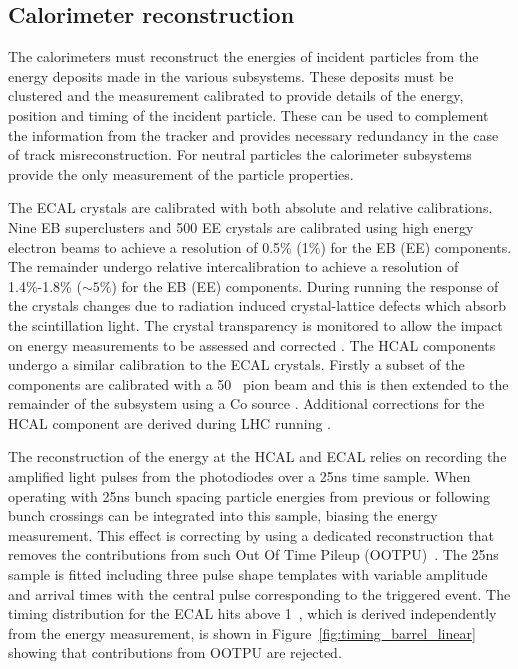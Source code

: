 \subsection{Calorimeter reconstruction}

The calorimeters must reconstruct the energies of incident particles from the energy deposits made in the 
various subsystems. These deposits must be clustered and the measurement calibrated to provide 
details of the energy, position and timing of the incident particle. These can be used to complement 
the information from the tracker and provides necessary redundancy in the case of track
misreconstruction. For neutral particles the calorimeter subsystems provide the only measurement of
the particle properties.

The ECAL crystals are calibrated with both absolute and relative calibrations. Nine EB superclusters
and 500 EE crystals are calibrated using high energy electron beams to achieve a resolution of 0.5\% (1\%) for the EB (EE) components. 
The remainder undergo relative intercalibration to achieve a resolution of 1.4\%-1.8\% ($\sim5\%$) for the EB (EE) components. 
During running the response of the crystals changes due to radiation induced crystal-lattice defects which absorb the scintillation light. 
The crystal transparency is monitored to allow the impact on energy measurements to be assessed and corrected \cite{ecal_calib}. 
The HCAL components undergo a similar calibration to the ECAL crystals. Firstly a subset of the components are calibrated with
a 50 \GeV~pion beam and this is then extended to the remainder of the subsystem using a Co source \cite{hcal_beam}. Additional corrections
for the HCAL component are derived during LHC running \cite{hcal_calib}.

The reconstruction of the energy at the HCAL and ECAL relies on recording the amplified light pulses from the photodiodes over a 25ns time
sample. When operating with 25ns bunch spacing particle energies from previous or following bunch crossings can be integrated
into this sample, biasing the energy measurement. This effect is correcting by using a dedicated reconstruction that removes
the contributions from such Out Of Time Pileup (OOTPU)~\cite{hcal_timing,ecal_timing}. The 25ns sample is fitted including three pulse shape templates with
variable amplitude and arrival times with the central pulse corresponding to the triggered event. The timing distribution for
the ECAL hits above 1~\GeV, which is derived independently from the energy measurement, is shown in Figure~\ref{fig:timing_barrel_linear} showing that
contributions from OOTPU are rejected.

